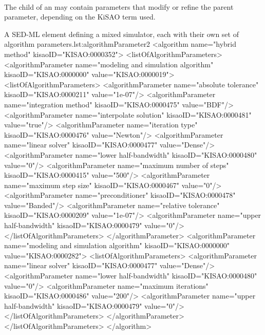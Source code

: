 \begin{blockChanged}
\paragraph*{}
The child  of an \AlgorithmParameter may contain parameters that modify or refine the parent parameter, depending on the KiSAO term used.  

\begin{myXmlLst}{A SED-ML  element defining a mixed simulator, each with their own set of algorithm parameters.}{lst:algorithmParameter2}
<algorithm name="hybrid method" kisaoID="KISAO:0000352">
    <listOfAlgorithmParameters>
        <algorithmParameter name="modeling and simulation algorithm" kisaoID="KISAO:0000000" value="KISAO:0000019">
            <listOfAlgorithmParameters>
                <algorithmParameter name="absolute tolerance"   kisaoID="KISAO:0000211" value="1e-07"/>
                <algorithmParameter name="integration method"   kisaoID="KISAO:0000475" value="BDF"/>
                <algorithmParameter name="interpolate solution" kisaoID="KISAO:0000481" value="true"/>
                <algorithmParameter name="iteration type"       kisaoID="KISAO:0000476" value="Newton"/>
                <algorithmParameter name="linear solver"        kisaoID="KISAO:0000477" value="Dense"/>
                <algorithmParameter name="lower half-bandwidth" kisaoID="KISAO:0000480" value="0"/>
                <algorithmParameter name="maximum number of steps" kisaoID="KISAO:0000415" value="500"/>
                <algorithmParameter name="maximum step size"    kisaoID="KISAO:0000467" value="0"/>
                <algorithmParameter name="preconditioner"       kisaoID="KISAO:0000478" value="Banded"/>
                <algorithmParameter name="relative tolerance"   kisaoID="KISAO:0000209" value="1e-07"/>
                <algorithmParameter name="upper half-bandwidth" kisaoID="KISAO:0000479" value="0"/>
            </listOfAlgorithmParameters>
        </algorithmParameter>
        <algorithmParameter name="modeling and simulation algorithm" kisaoID="KISAO:0000000" value="KISAO:0000282">
            <listOfAlgorithmParameters>
                <algorithmParameter name="linear solver"        kisaoID="KISAO:0000477" value="Dense"/>
                <algorithmParameter name="lower half-bandwidth" kisaoID="KISAO:0000480" value="0"/>
                <algorithmParameter name="maximum iterations"   kisaoID="KISAO:0000486" value="200"/>
                <algorithmParameter name="upper half-bandwidth" kisaoID="KISAO:0000479" value="0"/>
            </listOfAlgorithmParameters>
        </algorithmParameter>
    </listOfAlgorithmParameters>
</algorithm>
\end{myXmlLst}


\end{blockChanged}



